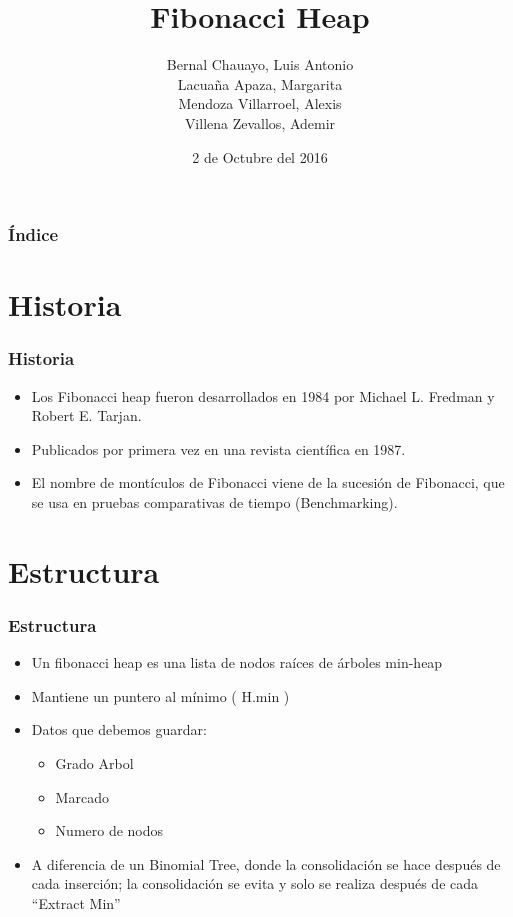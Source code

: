 \documentclass{beamer}
\title[Fibonacci Heap]{Fibonacci Heap}
\author[ALMA\and *Alexis\and Luis \and Margarita \and Ademir*]{{Bernal Chauayo, Luis Antonio}\\{Lacuaña Apaza, Margarita}\\{Mendoza Villarroel, Alexis}\\{Villena Zevallos, Ademir}}
\institute{{Ciencia de la Computación}
\\{Universidad Nacional de San Agustin}}
\date{2 de Octubre del 2016}
\begin{document}
\begin{frame}[plain]
    \titlepage
 \end{frame}
  
 \begin{frame}
  \frametitle{Índice}
  \begin{multicols}{2}
  \tableofcontents
  \end{multicols} 
\end{frame}

\section{Historia}
\begin{frame}
    \frametitle{Historia}
 \begin{itemize}
    \item Los Fibonacci heap  fueron desarrollados en 1984 por Michael L. Fredman y Robert E. Tarjan.
    \item Publicados por primera vez en una revista científica en 1987.
    \item El nombre de montículos de Fibonacci viene de la sucesión de Fibonacci, que se usa en pruebas comparativas de tiempo (Benchmarking).
\end{itemize}
\end{frame}

\section{Estructura}
\begin{frame}
  \frametitle{Estructura}
  \begin{itemize}
    \item Un fibonacci heap es una lista de nodos raíces de árboles min-heap 
\item Mantiene un puntero al mínimo ( H.min )
\item Datos que debemos guardar:

	\begin{itemize}
	 \item  Grado Arbol 
	  \item Marcado
	  \item Numero de nodos
	\end{itemize}

\item A diferencia de un Binomial Tree, donde la consolidación se hace después de cada inserción; la consolidación se evita y solo se realiza después de cada “Extract Min”

  \end{itemize}

\end{frame}
\end{document}
